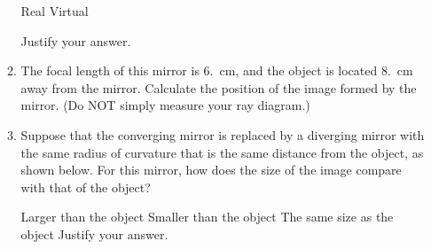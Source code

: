 \documentclass{../../../oss-classkick}
\begin{document}
\begin{enumerate}[leftmargin=15pt]
\begin{enumerate}
    \vspace{.2in}
    \underline{\hspace{.4in}} Real\hspace{.3in}
    \underline{\hspace{.4in}} Virtual

    \vspace{.1in}Justify your answer.
  \item The focal length of this mirror is \SI{6.}{\centi\metre}, and the
    object is located \SI{8.}{\centi\metre} away from the mirror. Calculate the
    position of the image formed by the mirror. (Do NOT simply measure your ray
    diagram.)
  \item Suppose that the converging mirror is replaced by a diverging mirror
    with the same radius of curvature that is the same distance from the
    object, as shown below.
    For this mirror, how does the size of the image compare with that of the
    object?

    \vspace{.2in}
    \underline{\hspace{.4in}} Larger than the object\hspace{.3in}
    \underline{\hspace{.4in}} Smaller than the object\hspace{.3in}
    \underline{\hspace{.4in}} The same size as the object
    Justify your answer.
  \end{enumerate}
  \newpage


\end{enumerate}
\end{document}
